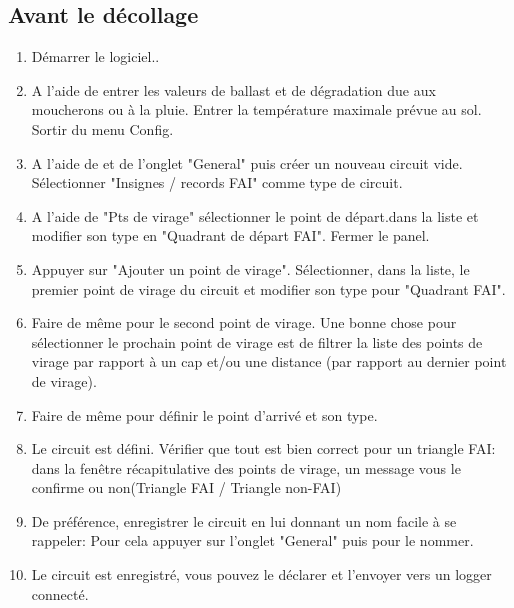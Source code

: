 \subsection*{Avant le décollage}
\begin{enumerate}
\item  Démarrer le logiciel.. 
\item  A l'aide de \blink{}entrer les valeurs de ballast et de dégradation due aux moucherons ou à la pluie. Entrer la température maximale prévue au sol. Sortir du menu Config.
\item  A l'aide de \blink{}et de l'onglet "General" puis créer un nouveau circuit vide. Sélectionner "Insignes / records FAI"  comme type de circuit.
\item A l'aide de "Pts de virage" sélectionner le point de départ.dans la liste et modifier son type en "Quadrant de départ FAI". Fermer le panel.
\item Appuyer sur "Ajouter un point de virage". Sélectionner, dans la liste, le premier point de virage du circuit et modifier son type pour "Quadrant FAI".
\item Faire de même pour le second point de virage. Une bonne chose pour sélectionner le prochain point de virage est de filtrer la liste des points de virage par rapport à un cap et/ou une distance (par rapport au dernier point de virage). 
\item  Faire de même pour définir le point d'arrivé et son type. 
\item Le circuit est défini. Vérifier que tout est bien correct pour un triangle FAI: dans la fenêtre récapitulative des points de virage, un message vous le confirme ou non(Triangle FAI / Triangle non-FAI) 
\item De préférence, enregistrer le circuit en lui donnant un nom facile à se rappeler: Pour cela appuyer sur l'onglet "General" puis pour le nommer.
\item Le circuit est enregistré, vous pouvez le déclarer et l'envoyer vers un logger connecté.
\end{enumerate}


